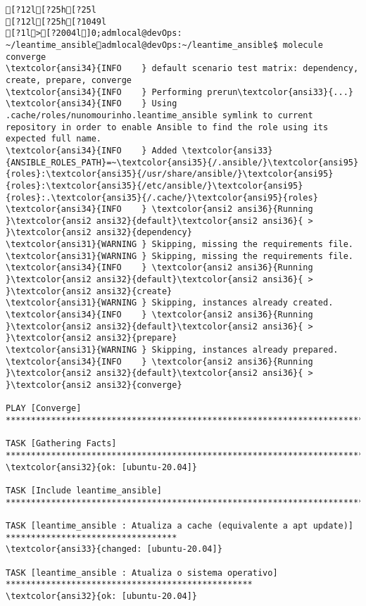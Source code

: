 \documentclass{scrartcl}
\begin{document}
\begin{Verbatim}
[?12l[?25h[?25l
[?12l[?25h[?1049l
[?1l>[?2004l]0;admlocal@devOps: ~/leantime_ansibleadmlocal@devOps:~/leantime_ansible$ molecule converge
\textcolor{ansi34}{INFO    } default scenario test matrix: dependency, create, prepare, converge
\textcolor{ansi34}{INFO    } Performing prerun\textcolor{ansi33}{...}
\textcolor{ansi34}{INFO    } Using .cache/roles/nunomourinho.leantime_ansible symlink to current repository in order to enable Ansible to find the role using its expected full name.
\textcolor{ansi34}{INFO    } Added \textcolor{ansi33}{ANSIBLE_ROLES_PATH}=~\textcolor{ansi35}{/.ansible/}\textcolor{ansi95}{roles}:\textcolor{ansi35}{/usr/share/ansible/}\textcolor{ansi95}{roles}:\textcolor{ansi35}{/etc/ansible/}\textcolor{ansi95}{roles}:.\textcolor{ansi35}{/.cache/}\textcolor{ansi95}{roles}
\textcolor{ansi34}{INFO    } \textcolor{ansi2 ansi36}{Running }\textcolor{ansi2 ansi32}{default}\textcolor{ansi2 ansi36}{ > }\textcolor{ansi2 ansi32}{dependency}
\textcolor{ansi31}{WARNING } Skipping, missing the requirements file.
\textcolor{ansi31}{WARNING } Skipping, missing the requirements file.
\textcolor{ansi34}{INFO    } \textcolor{ansi2 ansi36}{Running }\textcolor{ansi2 ansi32}{default}\textcolor{ansi2 ansi36}{ > }\textcolor{ansi2 ansi32}{create}
\textcolor{ansi31}{WARNING } Skipping, instances already created.
\textcolor{ansi34}{INFO    } \textcolor{ansi2 ansi36}{Running }\textcolor{ansi2 ansi32}{default}\textcolor{ansi2 ansi36}{ > }\textcolor{ansi2 ansi32}{prepare}
\textcolor{ansi31}{WARNING } Skipping, instances already prepared.
\textcolor{ansi34}{INFO    } \textcolor{ansi2 ansi36}{Running }\textcolor{ansi2 ansi32}{default}\textcolor{ansi2 ansi36}{ > }\textcolor{ansi2 ansi32}{converge}

PLAY [Converge] ****************************************************************************************

TASK [Gathering Facts] *********************************************************************************
\textcolor{ansi32}{ok: [ubuntu-20.04]}

TASK [Include leantime_ansible] ************************************************************************

TASK [leantime_ansible : Atualiza a cache (equivalente a apt update)] **********************************
\textcolor{ansi33}{changed: [ubuntu-20.04]}

TASK [leantime_ansible : Atualiza o sistema operativo] *************************************************
\textcolor{ansi32}{ok: [ubuntu-20.04]}


\end{Verbatim}
\end{document}

